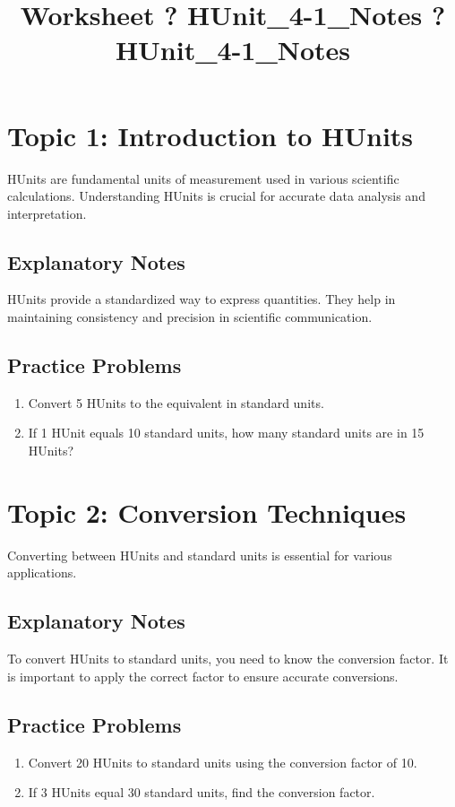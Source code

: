 \documentclass{article}
\title{Worksheet ? HUnit\_4-1\_Notes ? HUnit\_4-1\_Notes}
\author{}
\date{}
\begin{document}
\maketitle

\section*{Topic 1: Introduction to HUnits}
HUnits are fundamental units of measurement used in various scientific calculations. Understanding HUnits is crucial for accurate data analysis and interpretation.

\subsection*{Explanatory Notes}
HUnits provide a standardized way to express quantities. They help in maintaining consistency and precision in scientific communication.

\subsection*{Practice Problems}
\begin{enumerate}[label=\alph*)]
    \item Convert 5 HUnits to the equivalent in standard units.
    \item If 1 HUnit equals 10 standard units, how many standard units are in 15 HUnits?
\end{enumerate}

\section*{Topic 2: Conversion Techniques}
Converting between HUnits and standard units is essential for various applications. 

\subsection*{Explanatory Notes}
To convert HUnits to standard units, you need to know the conversion factor. It is important to apply the correct factor to ensure accurate conversions.

\subsection*{Practice Problems}
\begin{enumerate}[label=\alph*)]
    \item Convert 20 HUnits to standard units using the conversion factor of 10.
    \item If 3 HUnits equal 30 standard units, find the conversion factor.
\end{enumerate}
\end{document}
